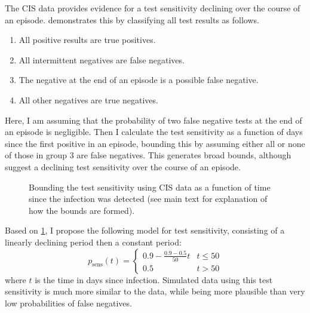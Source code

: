 \documentclass[thesis.tex]{subfiles}
\begin{document}
The CIS data provides evidence for a test sensitivity declining over the course of an episode.
 demonstrates this by classifying all test results as follows.
\begin{enumerate}
    \item All positive results are true positives.
    \item All intermittent negatives are false negatives.
    \item The negative at the end of an episode is a possible false negative.
    \item All other negatives are true negatives.
\end{enumerate}
Here, I am assuming that the probability of two false negative tests at the end of an episode is negligible.
Then I calculate the test sensitivity as a function of days since the first positive in an episode, bounding this by assuming either all or none of those in group 3 are false negatives.
This generates broad bounds, although suggest a declining test sensitivity over the course of an episode.
\begin{figure}
  \caption[Bounding test sensitivity using CIS data]{Bounding the test sensitivity using CIS data as a function of time since the infection was detected (see main text for explanation of how the bounds are formed).\label{imperf-test:fig:bounding-cis-sensitivity}}
\end{figure}

Based on \cref{imperf-test:fig:bounding-cis-sensitivity}, I propose the following model for test sensitivity, consisting of a linearly declining period then a constant period:
\begin{equation}
  p_\text{sens}(t) = \begin{cases}
    0.9 - \frac{0.9-0.5}{50}t &t \leq 50 \\
    0.5 &t > 50
  \end{cases}
\end{equation}
where $t$ is the time in days since infection.
Simulated data using this test sensitivity is much more similar to the data, while being more plausible than very low probabilities of false negatives.
\end{document}
